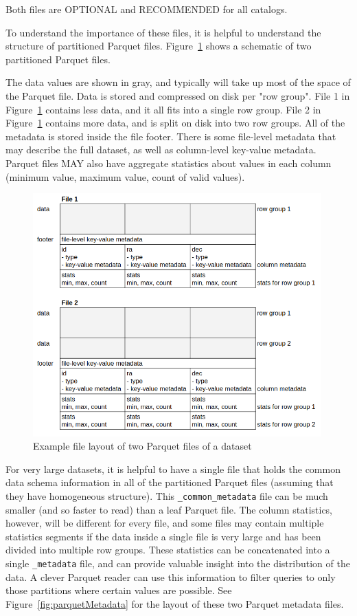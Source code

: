 \documentclass[11pt,a4paper]{ivoa}
\begin{document}
Both files are OPTIONAL and RECOMMENDED for all catalogs.

To understand the importance of these files, it is helpful to understand the structure of partitioned Parquet files. 
Figure~\ref{fig:partitionedParquet} shows a schematic of two partitioned Parquet files. 

The data values are shown in gray, and typically will take up most of the space of the Parquet file. 
Data is stored and compressed on disk per "row group".
File 1 in Figure~\ref{fig:partitionedParquet} contains less data, and it all fits into a single row group.
File 2 in Figure~\ref{fig:partitionedParquet} contains more data, and is split on disk into two row groups. 
All of the metadata is stored inside the file footer. There is some file-level metadata that may describe the full dataset, as well as column-level key-value metadata.
Parquet files MAY also have aggregate statistics about values in each column (minimum value, maximum value, count of valid values).

\begin{figure}
\centering
\includegraphics[width=0.99\textwidth]{leaf_files.png}
\caption{Example file layout of two Parquet files of a dataset}
\label{fig:partitionedParquet}
\end{figure}

For very large datasets, it is helpful to have a single file that holds the common data schema information in all of the partitioned Parquet files (assuming that they have homogeneous structure).
This \texttt{\_common\_metadata} file can be much smaller (and so faster to read) than a leaf Parquet file.
The column statistics, however, will be different for every file, and some files may contain multiple statistics segments if the data inside a single file is very large and has been divided into multiple row groups.
These statistics can be concatenated into a single \texttt{\_metadata} file, and can provide valuable insight into the distribution of the data. 
A clever Parquet reader can use this information to filter queries to only those partitions where certain values are possible.
See Figure~\ref{fig:parquetMetadata} for the layout of these two Parquet metadata files.
\end{document}
